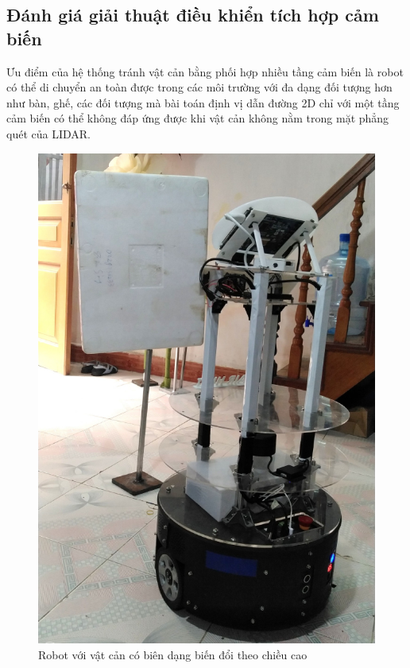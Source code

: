 {%
\subsection{Đánh giá giải thuật điều khiển tích hợp cảm biến}


Ưu điểm của hệ thống tránh vật cản bằng phối hợp nhiều tầng cảm biến là robot có thể di chuyển an toàn được trong các môi trường với đa dạng đối tượng hơn như bàn, ghế, các đối tượng mà bài toán định vị dẫn đường 2D chỉ với một tầng cảm biến có thể không đáp ứng được khi vật cản không nằm trong mặt phẳng quét của LIDAR.

\begin{figure}[htbp]
    \centering
    \includegraphics[width=0.5\linewidth]{figures/RB_scenario_ir_detectingObstacle.png}
    \caption{Robot với vật cản có biên dạng biến đổi theo chiều cao}
    \label{fig:scenario_ir_detectedObstacle}
\end{figure}

}
